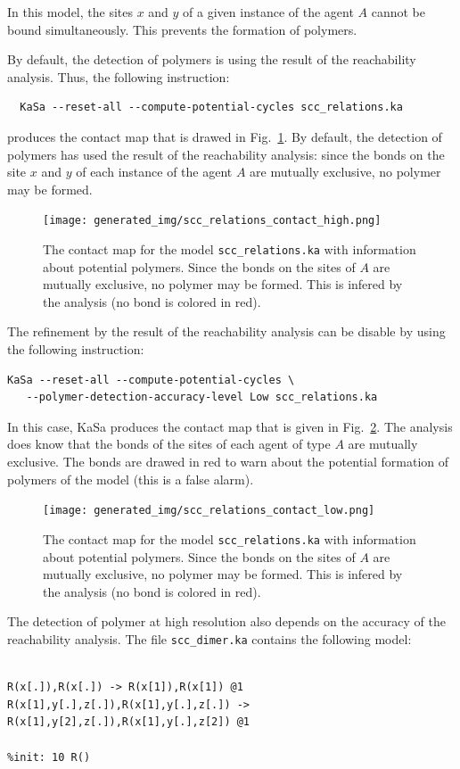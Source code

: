 \documentclass[11pt]{book}
\def\KaSa{\textsf{KaSa}}
\begin{document}
In this model, the sites $x$ and $y$ of a given instance of the agent $A$ cannot be bound simultaneously. This prevents the formation of polymers.

By default, the detection of polymers is using the result of the reachability analysis. Thus, the following instruction:
\begin{verbatim}
  KaSa --reset-all --compute-potential-cycles scc_relations.ka
\end{verbatim}
produces the contact map that is drawed in Fig.~\ref{fig:scc-relations-high}.
By default, the detection of polymers has used the result of the reachability analysis: since the bonds on the site $x$ and $y$ of each instance of the agent $A$ are mutually exclusive, no polymer may be formed.


\begin{figure}[h]
\centering
\texttt{[image: generated\_img/scc\_relations\_contact\_high.png]}
\caption{The contact map for the model \texttt{scc\_relations.ka} with information about potential polymers. Since the bonds on the sites of $A$ are mutually exclusive, no polymer may be formed. This is infered by the analysis (no bond is colored in red).}
\label{fig:scc-relations-high}
\end{figure}

The refinement by the result of the reachability analysis can be disable by using the following instruction:
\begin{verbatim}
KaSa --reset-all --compute-potential-cycles \
   --polymer-detection-accuracy-level Low scc_relations.ka
\end{verbatim}
In this case, {\KaSa} produces the contact map that is given in Fig.~\ref{fig:scc-relations-low}. The analysis does know that the bonds of the sites of each agent of type $A$ are mutually exclusive. The bonds are drawed in red to warn about the potential formation of polymers of the model (this is a false alarm).


\begin{figure}[htbp]
\centering
\texttt{[image: generated\_img/scc\_relations\_contact\_low.png]}
\caption{The contact map for the model \texttt{scc\_relations.ka} with information about potential polymers. Since the bonds on the sites of $A$ are mutually exclusive, no polymer may be formed. This is infered by the analysis (no bond is colored in red).}
\label{fig:scc-relations-low}
\end{figure}

The detection of polymer at high resolution also depends on the accuracy of the reachability analysis. The file \texttt{scc\_dimer.ka} contains the following model:
\begin{lstlisting}[language=kappa]
%agent: R(x,y,z)

R(x[.]),R(x[.]) -> R(x[1]),R(x[1]) @1
R(x[1],y[.],z[.]),R(x[1],y[.],z[.]) -> R(x[1],y[2],z[.]),R(x[1],y[.],z[2]) @1

%init: 10 R()
\end{lstlisting}
\end{document}
